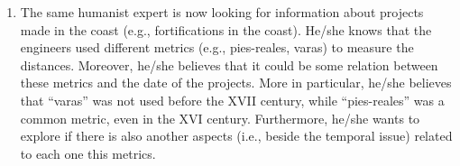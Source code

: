 \documentclass[11pt]{report}
\begin{document}
\begin{enumerate}
	\item The same humanist expert is now looking for information about projects made in the coast (e.g., fortifications in the coast). He/she knows that the engineers used different metrics (e.g., pies-reales, varas) to measure the distances. Moreover, he/she believes that it could be some relation between these metrics and the date of the projects. More in particular, he/she believes that ``varas'' was not used before the XVII century, while ``pies-reales'' was a common metric, even in the XVI century.
Furthermore, he/she wants to explore if there is also another aspects (i.e., beside the temporal issue) related to each one this metrics.
\end{enumerate}
\end{document}
